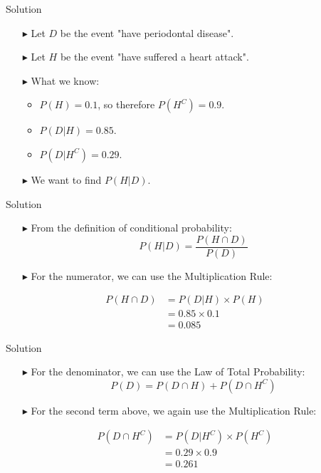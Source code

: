 \documentclass[12pt]{beamer}
\begin{document}
\begin{frame}{Solution}
	\begin{itemize}
		\item[\color{blue}$\blacktriangleright$] Let $D$ be the event "have periodontal disease".
		\item[\color{blue}$\blacktriangleright$] Let $H$ be the event "have suffered a heart attack".
		\item[\color{blue}$\blacktriangleright$] What we know:
		\begin{itemize}
			\item $P(H)=0.1$, so therefore $P(H^C)=0.9$.
			\item $P(D|H)=0.85$.
			\item $P(D|H^C)=0.29$.
		\end{itemize}
		\item[\color{blue}$\blacktriangleright$] We want to find $P(H|D)$.
	\end{itemize}
	
\end{frame}
\begin{frame}{Solution}
	\begin{itemize}
		\item[\color{blue}$\blacktriangleright$] From the definition of conditional probability:
		$$P(H|D)=\frac{P(H\cap D)}{P(D)}$$
		\item[\color{blue}$\blacktriangleright$] For the numerator, we can use the Multiplication Rule:
	\end{itemize}
	\begin{align*}
		P(H\cap D)&=P(D|H)\times P(H)\\
		&=0.85\times0.1\\
		&=0.085
	\end{align*}
	
\end{frame}

\begin{frame}{Solution}
	\begin{itemize}
		\item[\color{blue}$\blacktriangleright$] For the denominator, we can use the Law of Total Probability:
		$$P(D)=P(D\cap H)+P(D\cap H^C)$$
		\item[\color{blue}$\blacktriangleright$] For the second term above, we again use the Multiplication Rule:
	\end{itemize}
	\begin{align*}
		P(D\cap H^C)&=P(D|H^C)\times P(H^C)\\
		&=0.29\times0.9\\
		&=0.261
	\end{align*}
	
\end{frame}
\end{document}
